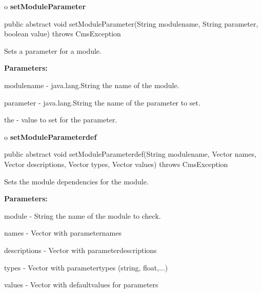 o {\bf setModuleParameter} 

\begin{PRE}
 public abstract void setModuleParameter(String modulename,
                                         String parameter,
                                         boolean value) throws CmsException
\end{PRE}

\begin{description}
\htmlDD Sets a parameter for a module. 

\begin{description}
\item {\bf Parameters:}  

modulename - java.lang.String the name of the module.  

parameter - java.lang.String the name of the parameter to set.  

the - value to set for the parameter.  
\end{description}

\end{description}

o {\bf setModuleParameterdef} 

\begin{PRE}
 public abstract void setModuleParameterdef(String modulename,
                                            Vector names,
                                            Vector descriptions,
                                            Vector types,
                                            Vector values) throws CmsException
\end{PRE}

\begin{description}
\htmlDD Sets the module dependencies for the module. 

\begin{description}
\item {\bf Parameters:}  

module - String the name of the module to check.  

names - Vector with parameternames  

descriptions - Vector with parameterdescriptions  

types - Vector with parametertypes (string, float,...)  

values - Vector with defaultvalues for parameters  
\end{description}

\end{description}

